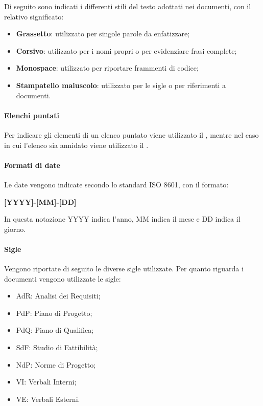 Di seguito sono indicati i differenti stili del testo adottati nei documenti, con il relativo significato:
\begin{itemize}
    \item \textbf{Grassetto}: utilizzato per singole parole da enfatizzare;
    \item \textbf{Corsivo}: utilizzato per i nomi propri o per evidenziare frasi complete;
    \item \textbf{Monospace}: utilizzato per riportare frammenti di codice;
    \item \textbf{Stampatello maiuscolo}: utilizzato per le sigle o per riferimenti a documenti.
\end{itemize}

\paragraph{Elenchi puntati}
\label{par:elenchi}

Per indicare gli elementi di un elenco puntato viene utilizzato il , mentre nel caso in cui l'elenco
sia annidato viene utilizzato il .

\paragraph{Formati di date}
\label{par:date}

Le date vengono indicate secondo lo standard \textsc{ISO 8601}, con il formato:
\begin{center}
    \textbf{[YYYY]-[MM]-[DD]}
\end{center}
In questa notazione YYYY indica l'anno, MM indica il mese e DD indica il giorno.

\paragraph{Sigle}
\label{par:sigle}

Vengono riportate di seguito le diverse sigle utilizzate.
Per quanto riguarda i documenti vengono utilizzate le sigle:
\begin{itemize}
    \item AdR: Analisi dei Requisiti;
    \item PdP: Piano di Progetto;
    \item PdQ: Piano di Qualifica;
    \item SdF: Studio di Fattibilità;
    \item NdP: Norme di Progetto;
    \item VI: Verbali Interni;
    \item VE: Verbali Esterni.
\end{itemize}

